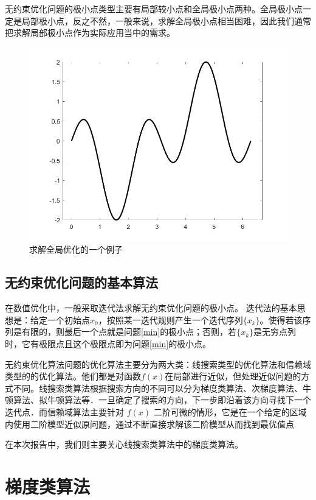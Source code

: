 无约束优化问题的极小点类型主要有局部较小点和全局极小点两种。全局极小点一定是局部极小点，反之不然，一般来说，求解全局极小点相当困难，因此我们通常把求解局部极小点作为实际应用当中的需求。
\begin{figure}[t]
	\centering
	\includegraphics[scale=0.4]{figures/极小值.png}
	\caption{求解全局优化的一个例子}
\end{figure}

\subsection{无约束优化问题的基本算法}

在数值优化中，一般采取迭代法求解无约束优化问题的极小点。
迭代法的基本思想是：给定一个初始点$ x_{0} $，按照某一迭代规则产生一个迭代序列$ \{ x_{k}\}$。使得若该序列是有限的，则最后一个点就是问题\ref{min}的极小点；否则，若$ \{ x_{k}\} $是无穷点列时，它有极限点且这个极限点即为问题\ref{min}的极小点。

无约束优化算法问题的优化算法主要分为两大类：线搜索类型的优化算法和信赖域类型的的优化算法。他们都是对函数$ f(x) $在局部进行近似，但处理近似问题的方式不同。线搜索类算法根据搜索方向的不同可以分为梯度类算法、次梯度算法、牛顿算法、拟牛顿算法等．一旦确定了搜索的方向，下一步即沿着该方向寻找下一个迭代点．而信赖域算法主要针对 $ f(x) $ 二阶可微的情形，它是在一个给定的区域内使用二阶模型近似原问题，通过不断直接求解该二阶模型从而找到最优值点\cite{刘浩洋2021最优化}

在本次报告中，我们则主要关心线搜索类算法中的梯度类算法。

\section{\hei 梯度类算法}
